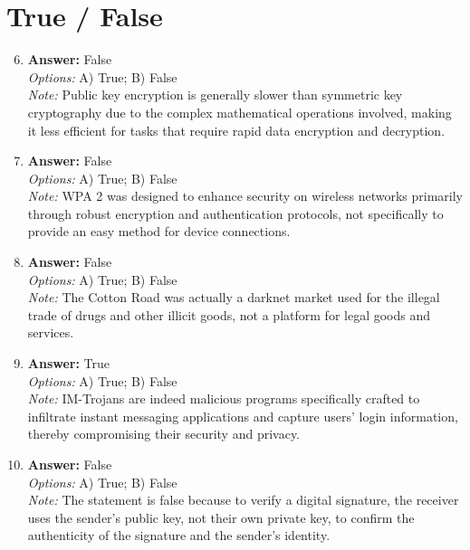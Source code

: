 \documentclass[12pt]{article}
\begin{document}
\section*{True / False}
\begin{enumerate}[label=\arabic*.]
\setcounter{enumi}{5}
\item \textbf{Answer:} False
\\ \textit{Options:} A) True; B) False
\\ \textit{Note:} Public key encryption is generally slower than symmetric key cryptography due to the complex mathematical operations involved, making it less efficient for tasks that require rapid data encryption and decryption.
\item \textbf{Answer:} False
\\ \textit{Options:} A) True; B) False
\\ \textit{Note:} WPA 2 was designed to enhance security on wireless networks primarily through robust encryption and authentication protocols, not specifically to provide an easy method for device connections.
\item \textbf{Answer:} False
\\ \textit{Options:} A) True; B) False
\\ \textit{Note:} The Cotton Road was actually a darknet market used for the illegal trade of drugs and other illicit goods, not a platform for legal goods and services.
\item \textbf{Answer:} True
\\ \textit{Options:} A) True; B) False
\\ \textit{Note:} IM-Trojans are indeed malicious programs specifically crafted to infiltrate instant messaging applications and capture users' login information, thereby compromising their security and privacy.
\item \textbf{Answer:} False
\\ \textit{Options:} A) True; B) False
\\ \textit{Note:} The statement is false because to verify a digital signature, the receiver uses the sender's public key, not their own private key, to confirm the authenticity of the signature and the sender's identity.
\end{enumerate}
\end{document}
